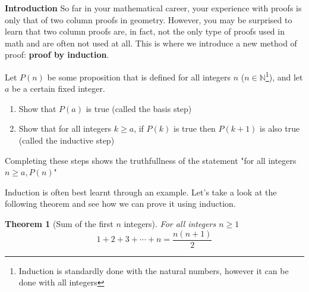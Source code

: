 \documentclass[addpoints]{exam}
\newtheorem{theorem}{Theorem}
\begin{document}
    \begin{tcolorbox}[breakable, title=INDUCTION INTRO, colframe=black, sharp corners, colback=white, colbacktitle=white, coltitle=black]
      \Large\textbf{Introduction}
      \newline\normalsize So far in your mathematical career, your experience with proofs is only that of two column proofs in geometry. However, you may be surprised to learn that two column proofs are, in fact, not the only type of proofs used in math and are often not used at all. This is where we introduce a new method of proof: \textbf{proof by induction}. 
          \begin{tcolorbox}[breakable, title=INDUCTION STEPS, colframe=black, sharp corners, colback=white, colbacktitle=white, coltitle=black]
          Let $P(n)$ be some proposition that is defined for all integers $n$ ($n \in \mathbb{N}$\footnote{Induction is standardly done with the natural numbers, however it can be done with all integers}), and let $a$ be a certain fixed integer.
          \begin{enumerate}
            \item Show that $P(a)$ is true (called the basis step)
            \item Show that for all integers $k \geq a$, if $P(k)$ is true then $P(k+1)$ is also true (called the inductive step)
          \end{enumerate}
          Completing these steps shows the truthfullness of the statement "for all integers $n \geq a, P(n)$"
        \end{tcolorbox}
    \end{tcolorbox}
    \vspace{0.2in}
    Induction is often best learnt through an example. Let's take a look at the following theorem and see how we can prove it using induction.
    \begin{theorem}[Sum of the first $n$ integers]
      For all integers $n \geq 1$
      \[
        1 + 2 + 3 + \cdots + n = \frac{n\left(n+1\right)}{2}
      \]
    \end{theorem}
    \ifprintanswers
\end{document}
